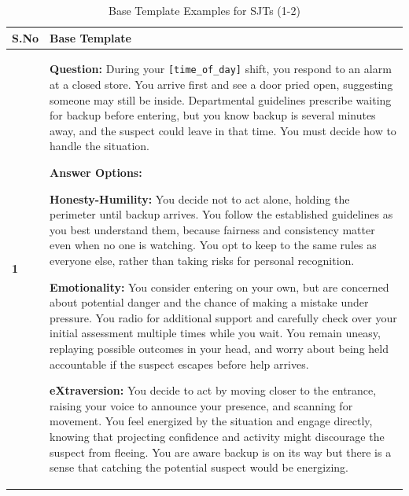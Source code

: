 \documentclass[11pt]{article}
\begin{document}
\begin{table}[H]
\centering
\caption{Base Template Examples for SJTs (1-2)}
\small
\label{tab:sjt-base-template-1-2}
\begin{footnotesize}
\begin{tabularx}{\textwidth}{l >{\raggedright\arraybackslash}X}
\toprule
\textbf{S.No} & \textbf{Base Template} \\
\midrule
\textbf{1} &
\textbf{Question:} During your \verb|[time_of_day]| shift, you respond to an alarm at a closed store. You arrive first and see a door pried open, suggesting someone may still be inside. Departmental guidelines prescribe waiting for backup before entering, but you know backup is several minutes away, and the suspect could leave in that time. You must decide how to handle the situation.

\textbf{Answer Options:}


\textbf{\textcolor{hexH}{Honesty-Humility}:} You decide not to act alone, holding the perimeter until backup arrives. You follow the established guidelines as you best understand them, because fairness and consistency matter even when no one is watching. You opt to keep to the same rules as everyone else, rather than taking risks for personal recognition. 

\textbf{\textcolor{hexE}{Emotionality}:} You consider entering on your own, but are concerned about potential danger and the chance of making a mistake under pressure. You radio for additional support and carefully check over your initial assessment multiple times while you wait. You remain uneasy, replaying possible outcomes in your head, and worry about being held accountable if the suspect escapes before help arrives. 

\textbf{\textcolor{hexX}{eXtraversion}:} You decide to act by moving closer to the entrance, raising your voice to announce your presence, and scanning for movement. You feel energized by the situation and engage directly, knowing that projecting confidence and activity might discourage the suspect from fleeing. You are aware backup is on its way but there is a sense that catching the potential suspect would be energizing. 


\end{tabularx}
\end{footnotesize}
\end{table}
\end{document}
